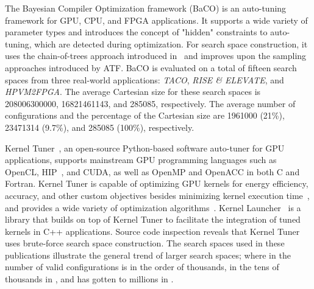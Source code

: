 The Bayesian Compiler Optimization framework (BaCO) is an auto-tuning framework for GPU, CPU, and FPGA applications. It supports a wide variety of parameter types and introduces the concept of "hidden" constraints to auto-tuning, which are detected during optimization. For search space construction, it uses the chain-of-trees approach introduced in~\cite{ATF} and improves upon the sampling approaches introduced by ATF. 
\ifrelatedworktable
\else
BaCO is evaluated on a total of fifteen search spaces from three real-world applications: \textit{TACO}, \textit{RISE \& ELEVATE}, and \textit{HPVM2FPGA}. The average Cartesian size for these search spaces is 208006300000, 16821461143, and 285085, respectively. 
The average number of configurations and the percentage of the Cartesian size are 1961000 (21\%), 23471314 (9.7\%), and 285085 (100\%), respectively. 
\fi

Kernel Tuner~\cite{vanwerkhovenKernelTunerSearchoptimizing2019}, an open-source Python-based software auto-tuner for GPU applications, supports mainstream GPU programming languages such as OpenCL, HIP~\cite{lurati2024bringing}, and CUDA, as well as OpenMP and OpenACC in both C and Fortran. 
Kernel Tuner is capable of optimizing GPU kernels for energy efficiency, accuracy, and other custom objectives besides minimizing kernel execution time~\cite{schoonhovenGoingGreenOptimizing2022}, and provides a wide variety of optimization algorithms~\cite{schoonhovenBenchmarkingOptimizationAlgorithms2022,willemsenBayesianOptimizationAutotuning2021}. 
Kernel Launcher~\cite{heldensKernelLauncherLibrary2023} is a library that builds on top of Kernel Tuner to facilitate the integration of tuned kernels in C++ applications. 
Source code inspection reveals that Kernel Tuner uses brute-force search space construction. 
\ifrelatedworktable
\else
The search spaces used in these publications illustrate the general trend of larger search spaces; where in \citeyear{vanwerkhovenKernelTunerSearchoptimizing2019} the number of valid configurations is in the order of thousands, in the tens of thousands in \citeyear{willemsenBayesianOptimizationAutotuning2021,schoonhovenBenchmarkingOptimizationAlgorithms2022,schoonhovenGoingGreenOptimizing2022}, and has gotten to millions in \citeyear{heldensKernelLauncherLibrary2023}. 
\fi
